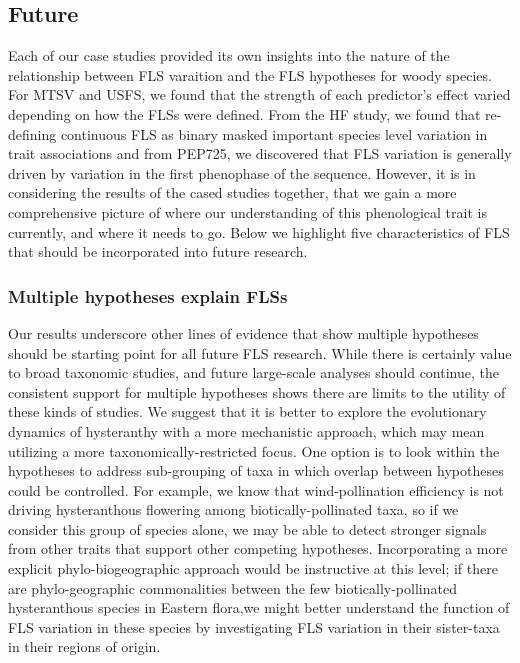 \documentclass[12pt]{article}\usepackage[]{graphicx}\usepackage[]{color}
\begin{document}
\subsection*{Future}
\indent\indent Each of our case studies provided its own insights into the nature of the relationship between FLS varaition and the FLS hypotheses for woody species. For MTSV and USFS, we found that the strength of each predictor's effect varied depending on how the FLSs were defined. From the HF study, we found that re-defining  continuous FLS as binary masked important species level variation in trait associations and from PEP725, we discovered that FLS variation is generally driven by variation in the first phenophase of the sequence. However, it is in considering the results of the cased studies together, that we gain a more comprehensive picture of where our understanding of this phenological trait is currently, and where it needs to go. Below we highlight five characteristics of FLS that should be incorporated into future research.
\subsubsection*{Multiple hypotheses explain FLSs}

\indent\indent Our results underscore other lines of evidence that show multiple hypotheses should be starting point for all future FLS research. While there is certainly value to broad taxonomic studies, and future large-scale analyses should continue, the consistent support for multiple hypotheses shows there are limits to the utility of these kinds of studies. We suggest that it is better to explore the evolutionary dynamics of hysteranthy with a more mechanistic approach, which may mean utilizing a more taxonomically-restricted focus. One option is to look within the hypotheses to address sub-grouping of taxa in which overlap between hypotheses could be controlled. For example, we know that wind-pollination efficiency is not driving hysteranthous flowering among biotically-pollinated taxa, so if we consider this group of species alone, we may be able to detect stronger signals from other traits that support other competing hypotheses. Incorporating a more explicit phylo-biogeographic approach would be instructive at this level; if there are phylo-geographic commonalities between the few biotically-pollinated hysteranthous species in Eastern flora,we might better understand the function of FLS variation in these species by investigating FLS variation in their sister-taxa in their regions of origin.\\
\end{document}
